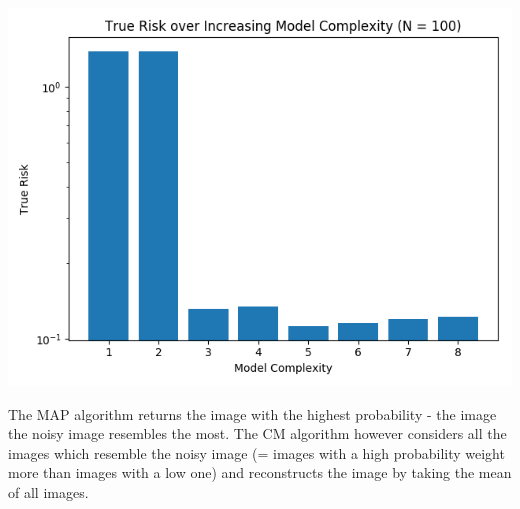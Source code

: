 \documentclass{article}
\begin{document}
\includegraphics[width=\linewidth]{true_100.png}

The MAP algorithm returns the image with the highest probability - the image the noisy image resembles the most. The CM algorithm however considers all the images which resemble the noisy image (= images with a high probability weight more than images with a low one) and reconstructs the image by taking the mean of all images.
\end{document}
